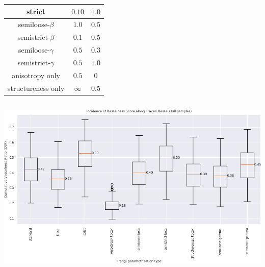 \documentclass[9pt]{beamer}
\begin{document}
\begin{frame}
\begin{columns}
\begin{column}{0.4\textwidth}
\begin{table}[p]
\begin{tabular}{|c|c|c|}
        strict & $0.10$ & $1.0$ \\ \hline
        semiloose-$\beta$ &$ 1.0$ & $0.5$ \\ \hline
        semistrict-$\beta$& $ 0.1$ &$ 0.5$ \\ \hline
        semiloose-$\gamma$ &$ 0.5$ & $0.3$ \\ \hline
        semistrict-$\gamma$& $ 0.5$ & $1.0$ \\ \hline
        anisotropy only & $ 0.5$& $0$ \\ \hline
        structureness only&  $ \infty$ & $0.5$ \\ \hline
      \end{tabular}
    \end{table}
  \end{column}
\end{columns}
\end{frame}

\begin{frame}
\includegraphics[width=\textwidth]{cvr_boxplot_wide-all-ucip-190322}
\end{frame}
\end{document}
